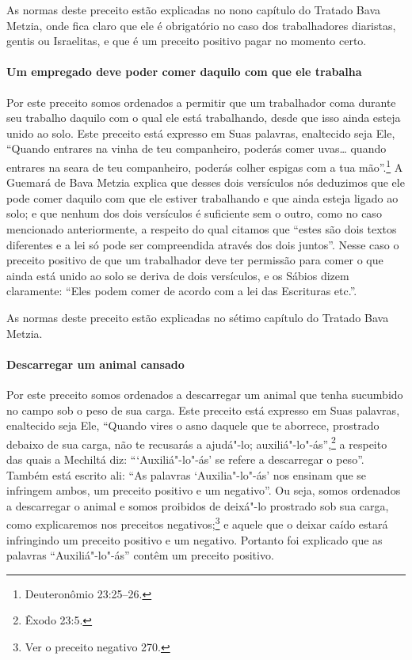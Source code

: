 \begin{multicols}{2}
As normas deste preceito estão explicadas no nono capítulo do Tratado
Bava Metzia\starr, onde fica claro que ele é obrigatório no caso dos
trabalhadores diaristas, gentis ou Israelitas, e que é um preceito
positivo pagar no momento certo.

\paragraph{Um empregado deve poder comer daquilo com que ele trabalha}

Por este preceito somos ordenados a permitir que um trabalhador coma
durante seu trabalho daquilo com o qual ele está trabalhando, desde que
isso ainda esteja unido ao solo. Este preceito está expresso em Suas
palavras, enaltecido seja Ele, ``Quando entrares na vinha de teu
companheiro, poderás comer uvas\ldots{} quando entrares na seara de teu
companheiro, poderás colher espigas com a tua mão''.\footnote{Deuteronômio
23:25--26.} A Guemará\starr{} de Bava Metzia\starr{} explica que desses dois versículos
nós deduzimos que ele pode comer daquilo com que ele estiver trabalhando
e que ainda esteja ligado ao solo; e que nenhum dos dois versículos é
suficiente sem o outro, como no caso mencionado
anteriormente, a respeito do qual citamos que ``estes são dois textos
diferentes e a lei só pode ser compreendida através dos dois juntos''.
Nesse caso o preceito positivo de que um trabalhador deve ter permissão
para comer o que ainda está unido ao solo se deriva de dois versículos,
e os Sábios dizem claramente: ``Eles podem comer de acordo com a lei das
Escrituras etc.''.

As normas deste preceito estão explicadas no sétimo capítulo do Tratado Bava Metzia\starr.

\paragraph{Descarregar um animal cansado}

Por este preceito somos ordenados a descarregar um animal que tenha
sucumbido no campo sob o peso de sua carga. Este preceito está expresso
em Suas palavras, enaltecido seja Ele, ``Quando vires o asno daquele que
te aborrece, prostrado debaixo de sua carga, não te recusarás a
ajudá"-lo; auxiliá"-lo"-ás'',\footnote{Êxodo 23:5.} a respeito das quais a Mechiltá\starr{}
diz: ```Auxiliá"-lo"-ás' se refere a descarregar o peso''. Também está
escrito ali: ``As palavras `Auxilia"-lo"-ás' nos ensinam que se infringem
ambos, um preceito positivo e um negativo''. Ou seja, somos ordenados a
descarregar o animal e somos proibidos de deixá"-lo prostrado sob sua
carga, como explicaremos nos preceitos negativos;\footnote{Ver o preceito negativo 270.}
e aquele que o deixar caído estará infringindo um preceito positivo e um
negativo. Portanto foi explicado que as palavras ``Auxiliá"-lo"-ás''
contêm um preceito positivo.


\end{multicols}
